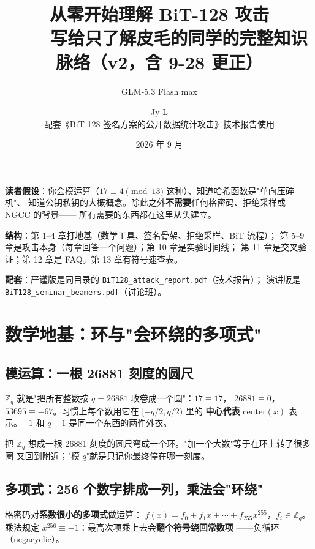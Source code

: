 \documentclass[11pt,a4paper]{ctexart}
\title{\bfseries 从零开始理解 BiT-128 攻击\\[0.3em]
\large ——写给只了解皮毛的同学的完整知识脉络（v2，含 9-28 更正）}
\author{GLM-5.3 Flash max \and Jy L\\{\small 配套《BiT-128 签名方案的公开数据统计攻击》技术报告使用}}
\date{2026 年 9 月}
\newcommand{\Z}{\mathbb{Z}}
\begin{document}
\maketitle

\begin{tcolorbox}[colback=blue!4,colframe=blue!55!black,title=这份文档怎么读,fonttitle=\bfseries]
\textbf{读者假设}：你会模运算（$17 \equiv 4 \pmod{13}$ 这种）、知道哈希函数是"单向压碎机"、
知道公钥私钥的大概概念。除此之外\textbf{不需要}任何格密码、拒绝采样或 NGCC 的背景——
所有需要的东西都在这里从头建立。

\textbf{结构}：第 1--4 章打地基（数学工具、签名骨架、拒绝采样、BiT 流程）；
第 5--9 章是攻击本身（每章回答一个问题）；第 10 章是实验时间线；
第 11 章是交叉验证；第 12 章是 FAQ。第 13 章有符号速查表。

\textbf{配套}：严谨版是同目录的 \texttt{BiT128\_attack\_report.pdf}（技术报告）；
演讲版是 \texttt{BiT128\_seminar\_beamers.pdf}（讨论班）。
\end{tcolorbox}

\tableofcontents
\newpage

\section{数学地基：环与"会环绕的多项式"}

\subsection{模运算：一根 26881 刻度的圆尺}

$\Z_q$ 就是"把所有整数按 $q=26881$ 收卷成一个圆"：$17 \equiv 17$，
$26881 \equiv 0$，$53695 \equiv -67$。习惯上每个数用它在 $[-q/2, q/2)$ 里的
\textbf{中心代表} $\mathrm{center}(x)$ 表示。$-1$ 和 $q-1$ 是同一个东西的两件外衣。

\begin{intuition}
把 $\Z_q$ 想成一根 26881 刻度的圆尺弯成一个环。"加一个大数"等于在环上转了很多圈
又回到附近；"模 $q$"就是只记你最终停在哪一刻度。
\end{intuition}

\subsection{多项式：256 个数字排成一列，乘法会"环绕"}

格密码对\textbf{系数很小的多项式}做运算：
$f(x) = f_0 + f_1 x + \cdots + f_{255} x^{255}$，$f_i \in \Z_q$。
乘法规定 $x^{256} \equiv -1$：最高次项乘上去会\textbf{翻个符号绕回常数项}
——负循环（negacyclic）。
\end{document}

